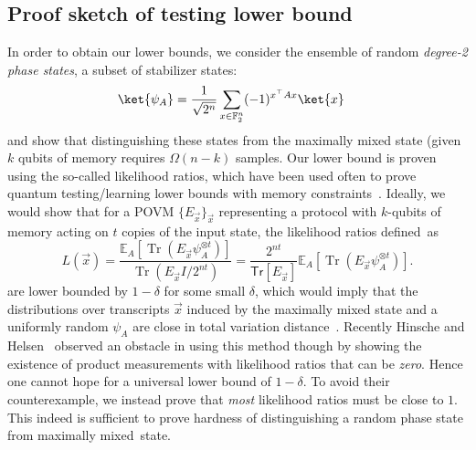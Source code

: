 \documentclass[11pt]{article}
\newcommand{\Tr}{\mathsf{Tr}}
\newcommand{\F}{\mathbb{F}}
\begin{document}
\subsection{Proof sketch of testing lower bound}
In order to  obtain our lower bounds, we consider the ensemble of random \emph{degree-2 phase states}, a subset of stabilizer states:
\begin{align}
    \ket{\psi_A} & = \frac{1}{\sqrt{2^n}}\sum_{x\in \F_2^n} (-1)^{x^\top A x}\ket{x}
\end{align}
and show that distinguishing these states  from the maximally mixed state (given $k$ qubits of memory requires $\Omega(n-k)$ samples.
Our lower bound is proven using the so-called likelihood ratios, which have been used often to prove quantum testing/learning lower bounds with memory constraints~\cite{chen2022exponential,chen2024optimal,bubeck2020entanglement}. Ideally, we would show that for a POVM $\{E_{\vec{x}}\}_{\vec{x}}$ representing a protocol with $k$-qubits of memory acting on $t$ copies of the input state, the likelihood ratios defined~as
$$
            L(\vec{x})
        =
        \frac{
        \mathbb E_A\!\left[
            \operatorname{Tr}(E_{\vec{x}}\psi_A^{\otimes t})
        \right]}
        {
        \operatorname{Tr}(E_{\vec{x}} I/2^{nt})
        }
        =
        \frac{2^{nt}}{\Tr[E_{\vec{x}}]}
        \mathbb E_A\!\left[
            \operatorname{Tr}(E_{\vec{x}}\psi_A^{\otimes t})
        \right].
$$ are lower bounded by $1-\delta$ for some small $\delta$, which would imply that the distributions over transcripts $\vec{x}$ induced by the maximally mixed state and a uniformly random $\psi_A$ are close in total variation distance~\cite{chen2022exponential}. Recently Hinsche and Helsen~\cite{hinsche2025single} observed an obstacle in using this method though by showing the existence of product measurements with likelihood ratios that can be \emph{zero}. Hence one cannot hope for a universal lower bound of $1-\delta$. To avoid their counterexample, we instead prove that \emph{most} likelihood ratios must be close to $1$. This indeed is sufficient to prove hardness of distinguishing a random phase state from maximally mixed~state. 
\end{document}
